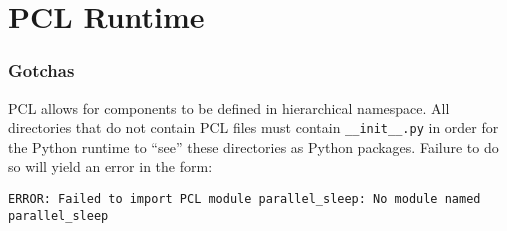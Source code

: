 \chapter{PCL Runtime}


\subsection{Gotchas}
PCL allows for components to be defined in hierarchical namespace. All directories that do not contain PCL files must contain \texttt{\_\_init\_\_.py} in order for the Python runtime to ``see'' these directories as Python packages. Failure to do so will yield an error in the form:
\begin{verbatim}
ERROR: Failed to import PCL module parallel_sleep: No module named parallel_sleep
\end{verbatim}
